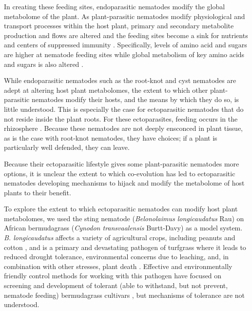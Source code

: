 \documentclass[fleqn,10pt]{wlscirep}
\begin{document}
In creating these feeding sites, endoparasitic nematodes modify the global metabolome of the plant.  As plant-parasitic nematodes modify physiological and transport processes within the host plant, primary and secondary metabolite production and flows are altered and the feeding sites become a sink for nutrients and centers of suppressed immunity \cite{bartlem2013vascularization}.  Specifically, levels of amino acid and sugars are higher at nematode feeding sites \cite{siddique2015metabolism} while global metabolism of key amino acids and sugars is also altered \cite{eloh2016untargeted, hofmann2010metabolic}.  


While endoparasitic nematodes such as the root-knot and cyst nematodes are adept at altering host plant metabolomes, the extent to which other plant-parasitic nematodes modify their hosts, and the means by which they do so, is little understood.  This is especially the case for ectoparasitic nematodes that do not reside inside the plant roots.  For these ectoparasites, feeding occurs in the rhizosphere \cite{sijmons1994parasitic}.  Because these nematodes are not deeply ensconced in plant tissue, as is the case with root-knot nematodes, they have choices; if a plant is particularly well defended, they can leave.  

Because their ectoparasitic lifestyle gives some plant-parasitic nematodes more options, it is unclear the extent to which co-evolution has led to ectoparasitic nematodes developing mechanisms to hijack and modify the metabolome of host plants to their benefit.  

To explore the extent to which ectoparasitic nematodes can modify host plant metabolomes, we used the sting nematode (\textit{Belonolaimus longicaudatus} Rau) on African bermudagrass  (\textit{Cynodon transvaalensis} Burtt-Davy) as a model system.  \textit{B. longicaudatus} affects a variety of agricultural crops, including peanuts and cotton \cite{kutsuwa2015belonolaimus,crow2000yield}, and is a primary and devastating pathogen of turfgrass \cite{shaver2017damage, bekal2000population} where it leads to reduced drought tolerance, environmental concerns due to leaching, and, in combination with other stresses, plant death \cite{pang2011bermudagrass}.   Effective and environmentally friendly control methods for working with this pathogen have focused on screening and development of tolerant (able to withstand, but not prevent, nematode feeding) bermudagrass cultivars \cite{pang2011bermudagrass,pang2011screening}, but mechanisms of tolerance are not understood. 
\end{document}

